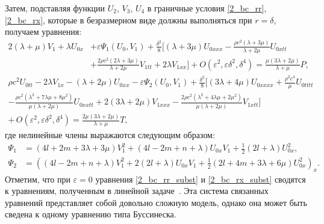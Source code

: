 \documentclass[12pt, a4paper]{report}
\begin{document}
Затем, подставляя функции $ U_2 $, $ V_3 $, $ U_4 $ в граничные условия \eqref{2_bc_rr}, \eqref{2_bc_rx}, которые в безразмерном виде должны выполняться при $r = \delta$, получаем уравнения:
\begin{equation} \label{2_bc_rr_subst}
\begin{split}
2 (\lambda + \mu) V_1 + \lambda U_{0x} &+\varepsilon \Psi_1(U_0, V_1) + \frac{\delta^2}{8} \bigg[ (\lambda + 3\mu) U_{0xxx}- \frac{\rho c^2(\lambda + 3\mu)}{\lambda + 2\mu} U_{0xtt} \\
&+ \frac{2\rho c^2(2\lambda + 3\mu)}{\lambda + 2\mu} V_{1tt} + 2\lambda V_{1xx}\bigg] 
+ O(\varepsilon^2, \varepsilon\delta^2, \delta^4) =  \frac{\mu(3\lambda + 2\mu)}{\lambda + \mu} P,
\end{split}
\end{equation}
\begin{equation} \label{2_bc_rx_subst}
\begin{split}
\rho  c^2 U_{0tt} -2 \lambda  V_{1x}-(\lambda +2 \mu ) U_{0xx} - \varepsilon \Psi_2(U_0, V_1)
+ \frac{\delta^2}{8}\bigg[(3\lambda + 4\mu)U_{0xxxx} + \frac{\rho^2 c^4}{\mu}U_{0tttt}\\
- \frac{\rho c^2\left(\lambda^2 + 7\lambda\mu + 8\mu^2\right)}{\mu(\lambda + 2\mu)} U_{0xxtt} + 2(3\lambda + 2\mu)V_{1xxx} - \frac{2 \rho  c^2 \left(\lambda ^2+4 \lambda  \mu +2 \mu ^2\right)}{\mu(\lambda + 2\mu)} V_{1xtt} \bigg]\\
+\,O(\varepsilon^2, \varepsilon\delta^2, \delta^4)
= \frac{2\mu(3\lambda + 2\mu)}{\lambda + \mu} T,
\end{split}
\end{equation}
где нелинейные члены выражаются следующим образом: 
\begin{align}
	\nonumber
	\Psi_1 &= (4l + 2m + 3\lambda + 3\mu) V_1^2 + (4l - 2m + n + \lambda) U_{0x} V_1 + \frac{1}{2} (2l + \lambda) U_{0x}^2, \\
	\nonumber
	\Psi_2 &= \left((4l - 2m + n + \lambda) V_1^2 + 2(2l + \lambda) U_{0x} V_1 + \frac12(2l + 4m + 3\lambda + 6\mu) U_{0x}^2 \right)_x.
\end{align}
Отметим, что при $\varepsilon = 0$ уравнения \eqref{2_bc_rr_subst} и \eqref{2_bc_rx_subst} сводятся к уравнениям, полученным в линейной задаче~\cite{bostrm2000}. Эта система связанных уравнений представляет собой довольно сложную модель, однако она может быть сведена к одному уравнению типа Буссинеска.
\end{document}
